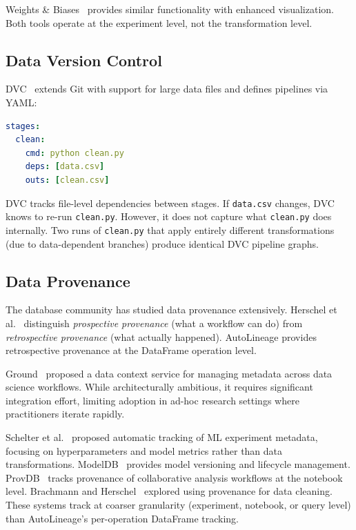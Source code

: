\documentclass[10pt,twocolumn]{article}
\begin{document}
Weights \& Biases~\cite{wandb2020} provides similar functionality with enhanced visualization. Both tools operate at the experiment level, not the transformation level.

\subsection{Data Version Control}

DVC~\cite{kuprieiev2021} extends Git with support for large data files and defines pipelines via YAML:

\begin{lstlisting}[numbers=none,language=yaml]
stages:
  clean:
    cmd: python clean.py
    deps: [data.csv]
    outs: [clean.csv]
\end{lstlisting}

DVC tracks file-level dependencies between stages. If \texttt{data.csv} changes, DVC knows to re-run \texttt{clean.py}. However, it does not capture what \texttt{clean.py} does internally. Two runs of \texttt{clean.py} that apply entirely different transformations (due to data-dependent branches) produce identical DVC pipeline graphs.

\subsection{Data Provenance}

The database community has studied data provenance extensively. Herschel et al.~\cite{herschel2017} distinguish \emph{prospective provenance} (what a workflow can do) from \emph{retrospective provenance} (what actually happened). AutoLineage provides retrospective provenance at the DataFrame operation level.

Ground~\cite{hellerstein2017} proposed a data context service for managing metadata across data science workflows. While architecturally ambitious, it requires significant integration effort, limiting adoption in ad-hoc research settings where practitioners iterate rapidly.

Schelter et al.~\cite{schelter2017} proposed automatic tracking of ML experiment metadata, focusing on hyperparameters and model metrics rather than data transformations. ModelDB~\cite{vartak2016} provides model versioning and lifecycle management. ProvDB~\cite{miao2017} tracks provenance of collaborative analysis workflows at the notebook level. Brachmann and Herschel~\cite{brachmann2020} explored using provenance for data cleaning. These systems track at coarser granularity (experiment, notebook, or query level) than AutoLineage's per-operation DataFrame tracking.
\end{document}
